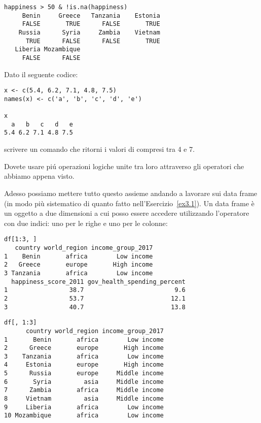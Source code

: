 {{{{\begin{lstlisting}[style=Rstyle]
happiness > 50 & !is.na(happiness)
     Benin     Greece   Tanzania    Estonia 
     FALSE       TRUE      FALSE       TRUE 
    Russia      Syria     Zambia    Vietnam 
      TRUE      FALSE      FALSE       TRUE 
   Liberia Mozambique 
     FALSE      FALSE 
\end{lstlisting}


\vspace{0.5cm} 

\begin{exercise}\label{ex3.5}
	
\noindent Dato il seguente codice:
	
\begin{lstlisting}[style=Rstyle]
x <- c(5.4, 6.2, 7.1, 4.8, 7.5)
names(x) <- c('a', 'b', 'c', 'd', 'e')

x
  a   b   c   d   e
5.4 6.2 7.1 4.8 7.5 
\end{lstlisting}
%
scrivere un comando che ritorni i valori di  compresi tra 4 e 7.

	\begin{myitemize}
		\item Dovete usare pi\'u operazioni logiche unite tra loro attraverso gli operatori che abbiamo appena visto.
	\end{myitemize}

\end{exercise}

\noindent Adesso possiamo mettere tutto questo assieme andando a lavorare sui data frame (in modo pi\`u sistematico di quanto fatto nell'Esercizio~\ref{ex3.1}). Un data frame \`e un oggetto a due dimensioni a cui posso essere accedere utilizzando l'operatore \lsin{[]} con due indici: uno per le righe e uno per le colonne:

\begin{lstlisting}[style=Rstyle]
df[1:3, ]
   country world_region income_group_2017
1    Benin       africa        Low income
2   Greece       europe       High income
3 Tanzania       africa        Low income
  happiness_score_2011 gov_health_spending_percent
1                 38.7                         9.6
2                 53.7                        12.1
3                 40.7                        13.8
\end{lstlisting}

\begin{lstlisting}[style=Rstyle]
df[, 1:3]
      country world_region income_group_2017
1       Benin       africa        Low income
2      Greece       europe       High income
3    Tanzania       africa        Low income
4     Estonia       europe       High income
5      Russia       europe     Middle income
6       Syria         asia     Middle income
7      Zambia       africa     Middle income
8     Vietnam         asia     Middle income
9     Liberia       africa        Low income
10 Mozambique       africa        Low income
\end{lstlisting}

}}}}
